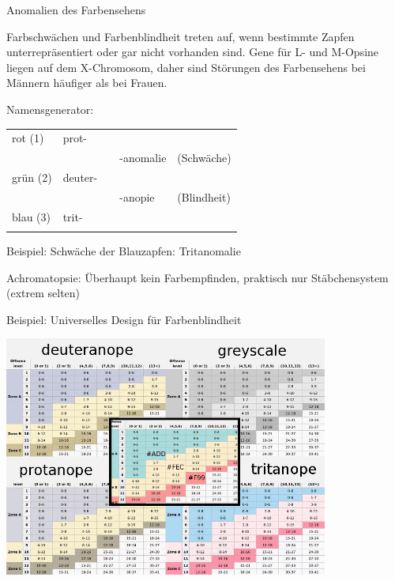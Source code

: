 \documentclass{beamer}
\begin{document}
\begin{frame}{Anomalien des Farbensehens}

Farbschwächen und Farbenblindheit treten auf, wenn bestimmte Zapfen unterrepräsentiert oder gar nicht vorhanden sind. Gene für L- und M-Opsine liegen auf dem X-Chromosom, daher sind Störungen des Farbensehens bei Männern häufiger als bei Frauen. \\[0.5 cm]

\pause

Namensgenerator: \\[0.5 cm]


\begin{tabular}{lllll}
rot (1)    & prot- & \\
            &       & & -anomalie &  (Schwäche)\\
grün (2)    & deuter-  &&\\
            &           & \qquad& -anopie & (Blindheit) \\
blau (3)     & trit- \\&
\end{tabular}

Beispiel: Schwäche der Blauzapfen: \pause Tritanomalie

\pause

Achromatopsie: Überhaupt kein Farbempfinden, praktisch nur Stäbchensystem (extrem selten)
\end{frame}

\begin{frame}{Beispiel: Universelles Design für Farbenblindheit}

\begin{center}
    \includegraphics[width=0.8\textwidth]{Safe_Chart_Colors-F99-FEC-ADD.jpg}
\end{center}
    
\end{frame}
\end{document}
